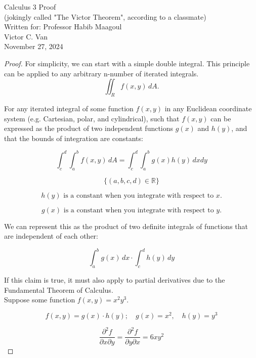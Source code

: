 \documentclass{article}
\begin{document}
\begin{titlepage}
    \centering
    \vspace*{\fill} %
    {\Large Calculus 3 Proof} \\[0.5cm]
    {\Large (jokingly called "The Victor Theorem", according to a classmate)} \\[0.5cm]
    {\Large Written for: Professor Habib Maagoul} \\[0.5cm]
    {\large Victor C. Van} \\[1cm]
    {\large November 27, 2024}
    \vspace*{\fill} %
\end{titlepage}

\begin{proof}

For simplicity, we can start with a simple double integral. This principle can be applied to any arbitrary n-number of iterated integrals.
\[
    \iint_Rf(x,y) \, dA.
\]

For any iterated integral of some function $f(x,y)$ in any Euclidean coordinate system (e.g. Cartesian, polar, and cylindrical), such that $f(x,y)$ can be expressed as the product of two independent functions $g(x)$ and $h(y)$, and that the bounds of integration are constants:

\[
    \int_{c}^{d} \int_{a}^{b} f(x, y) \, dA = \int_{c}^{d} \int_{a}^{b} g(x)h(y) \,dxdy
\]

\[
    \{(a, b, c, d) \in \mathbb{R}\}
\]

\[
    h(y) \text{ is a constant when you integrate with respect to } x.
\]

\[
    g(x) \text{ is a constant when you integrate with respect to } y.
\]

We can represent this as the product of two definite integrals of functions that are independent of each other:

\[
\int_{a}^{b}g(x) \,dx \cdot \int_{c}^{d}h(y) \,dy
\]

If this claim is true, it must also apply to partial derivatives due to the Fundamental Theorem of Calculus.\\

Suppose some function $f(x, y) = x^2 y^3$.

\[
    f(x, y) = g(x) \cdot h(y); \quad g(x) = x^2, \quad h(y) = y^3
\]

\[
    \frac{\partial^{2} f}{\partial x \partial y} = \frac{\partial^{2}f}{\partial y \partial x} = 6xy^{2}
\]


\end{proof}
\end{document}
